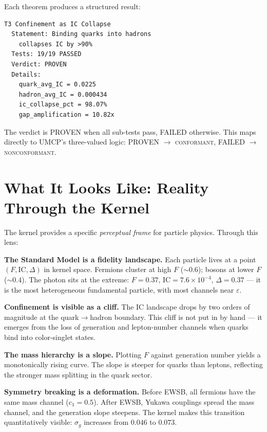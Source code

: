 \documentclass[
  aps,
  prd,
  twocolumn,
  superscriptaddress,
  nofootinbib,
  floatfix
]{revtex4-2}
\newcommand{\eps}{\varepsilon}
\newcommand{\regime}[1]{\textsc{#1}}
\newcommand{\conform}{\regime{conformant}}
\newcommand{\IC}{\mathrm{IC}}
\begin{document}
Each theorem produces a structured result:

\begin{verbatim}
T3 Confinement as IC Collapse
  Statement: Binding quarks into hadrons
    collapses IC by >90%
  Tests: 19/19 PASSED
  Verdict: PROVEN
  Details:
    quark_avg_IC = 0.0225
    hadron_avg_IC = 0.000434
    ic_collapse_pct = 98.07%
    gap_amplification = 10.82x
\end{verbatim}

The verdict is PROVEN when all sub-tests pass, FAILED otherwise.
This maps directly to UMCP's three-valued logic:
PROVEN $\to$ \conform{}, FAILED $\to$ \regime{nonconformant}.

\section{What It Looks Like: Reality Through the Kernel}
\label{sec:reality}

The kernel provides a specific \emph{perceptual frame} for
particle physics.  Through this lens:

\textbf{The Standard Model is a fidelity landscape.}
Each particle lives at a point $(F, \IC, \Delta)$ in kernel
space.  Fermions cluster at high $F$ ($\sim 0.6$); bosons at
lower $F$ ($\sim 0.4$).  The photon sits at the extreme:
$F = 0.37$, $\IC = 7.6 \times 10^{-4}$, $\Delta = 0.37$ ---
it is the most heterogeneous fundamental particle, with most
channels near $\eps$.

\textbf{Confinement is visible as a cliff.}  The $\IC$ landscape
drops by two orders of magnitude at the quark$\to$hadron
boundary.  This cliff is not put in by hand --- it emerges from
the loss of generation and lepton-number channels when quarks
bind into color-singlet states.

\textbf{The mass hierarchy is a slope.}  Plotting $F$ against
generation number yields a monotonically rising curve.  The
slope is steeper for quarks than leptons, reflecting the
stronger mass splitting in the quark sector.

\textbf{Symmetry breaking is a deformation.}  Before EWSB,
all fermions have the same mass channel ($c_1 = 0.5$).
After EWSB, Yukawa couplings spread the mass channel,
and the generation slope steepens.  The kernel makes this
transition quantitatively visible: $\sigma_g$ increases
from $0.046$ to $0.073$.
\end{document}
